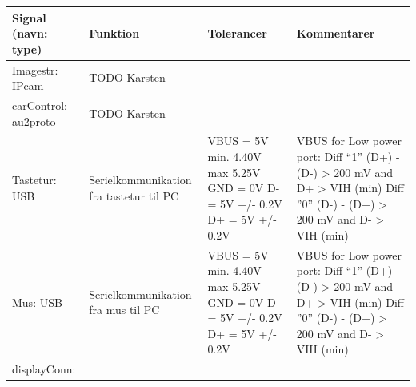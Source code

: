 \begin{table}[h]
	\centering
	\begin{tabularx}{\textwidth}{|l|X|X|X|} \hline
	\textbf{Signal (navn: type)} & \textbf{Funktion} & \textbf{Tolerancer} & \textbf{Kommentarer} \\ \hline
Imagestr: IPcam
	& TODO Karsten %
	& 
 	& 
	\\ \hline
	
carControl: au2proto
	& TODO Karsten %
	& 
	& 
	\\ \hline
	
Tastetur: USB
	& Serielkommunikation fra tastetur til PC 
	& VBUS = 5V min. 4.40V max 5.25V \newline
		GND = 0V \newline
		D- = 5V +/- 0.2V \newline
		D+ = 5V +/- 0.2V \newline
	
	& VBUS for Low power port: \newline
		Diff  “1” \newline
		(D+) - (D-) > 200 mV \newline
		and D+ > VIH (min) \newline
		Diff ”0” \newline
		(D-) - (D+) > 200 mV \newline
		and D- > VIH (min) \newline
	
	\\ \hline	
	
Mus: USB
	& Serielkommunikation fra mus til PC 
	& VBUS = 5V min. 4.40V max 5.25V \newline
		GND = 0V \newline
		D- = 5V +/- 0.2V \newline
		D+ = 5V +/- 0.2V \newline

	& VBUS for Low power port: \newline
		Diff  “1” \newline
		(D+) - (D-) > 200 mV \newline
		and D+ > VIH (min) \newline
		Diff ”0” \newline
		(D-) - (D+) > 200 mV \newline
		and D- > VIH (min) \newline

\\ \hline
	
displayConn:
	&   
	&  
	&  
	\\ \hline
	

\end{tabularx}
\end{table}
